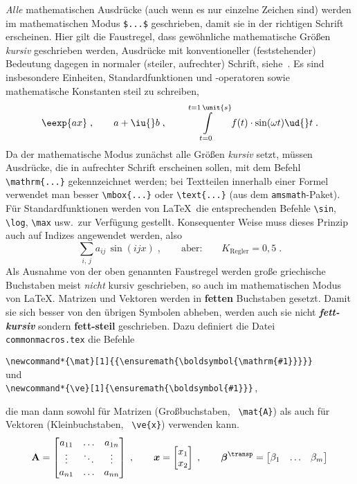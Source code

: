 \emph{Alle} mathematischen Ausdrücke (auch wenn es nur einzelne Zeichen sind) werden im mathematischen Modus \verb|$...$| geschrieben, damit sie in der
richtigen Schrift erscheinen.
Hier gilt die Faustregel, dass gewöhnliche mathematische Größen \emph{kursiv} geschrieben werden, Ausdrücke mit konventioneller (feststehender) Bedeutung dagegen in normaler (steiler, aufrechter) Schrift, siehe~\cite{DIN1338}.
Es sind insbesondere Einheiten, Standardfunktionen und -operatoren sowie mathematische Konstanten steil zu schreiben,
\begin{equation*}
	\eexp{ax}\;,\qquad a+\iu{}b\;,\qquad
	\int\limits_{t=0}^{t=1\,\unit{s}} f(t)\cdot\sin(\omega t)\ud{}t\;.
\end{equation*}
Da der mathematische Modus zunächst alle Größen \emph{kursiv} setzt, müssen Ausdrücke, die in aufrechter Schrift erscheinen sollen, mit dem Befehl
\verb|\mathrm{...}| gekennzeichnet werden; bei Textteilen innerhalb einer Formel verwendet man besser \verb|\mbox{...}| oder \verb|\text{...}| (aus dem
\verb|amsmath|-Paket).
Für Standardfunktionen werden von \LaTeX\ die entsprechenden Befehle \verb|\sin|, \verb|\log|, \verb|\max| usw.\ zur Verfügung gestellt.
Konsequenter Weise muss dieses Prinzip auch auf Indizes angewendet werden, also \zB
\begin{equation*}
	\sum_{i,\,j}a_{ij}\,\sin(ijx)\;,\qquad\text{aber:}\qquad
	K_\mathrm{Regler} = 0,5\;.
\end{equation*}
Als Ausnahme von der oben genannten Faustregel werden große griechische Buchstaben meist \emph{nicht} kursiv geschrieben, so auch im mathematischen Modus von
\LaTeX.
Matrizen und Vektoren werden in \textbf{fetten} Buchstaben gesetzt.
Damit sie sich besser von den übrigen Symbolen abheben, werden auch sie nicht \textbf{\emph{fett-kursiv}} sondern \textbf{fett-steil} geschrieben.
Dazu definiert die Datei \texttt{commonmacros.tex} die Befehle
\begin{center}
	\verb|\newcommand*{\mat}[1]{{\ensuremath{\boldsymbol{\mathrm{#1}}}}}|\\
	und\\
	\verb|\newcommand*{\ve}[1]{\ensuremath{\boldsymbol{#1}}}|\,,
\end{center}
die man dann sowohl für Matrizen (Großbuchstaben, \zB\ \verb|\mat{A}|) als auch für Vektoren (Kleinbuchstaben, \zB\ \verb|\ve{x}|) verwenden kann.
\begin{equation*}
	\mat{A} = \begin{bmatrix}
		a_{11} & \ldots & a_{1n}\\
		\vdots & \ddots & \vdots\\
		a_{n1} & \ldots & a_{nn}
	\end{bmatrix}\;,\qquad
	\ve{x} = \begin{bmatrix}
		x_1\\
		x_2
	\end{bmatrix}\;,\qquad
	\ve{\beta}^\transp = \begin{bmatrix}\beta_1	&	\ldots	&	\beta_m\end{bmatrix}
\end{equation*}

